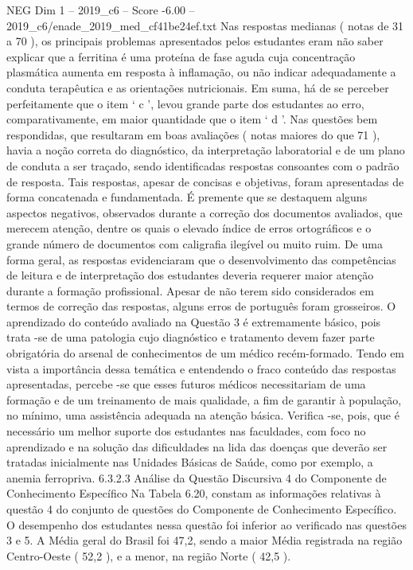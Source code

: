 \begin{textsample}{NEG Dim 1 – 2019\_c6 – Score -6.00 – 2019\_c6/enade\_2019\_med\_cf41be24ef.txt}
Nas respostas medianas ( notas de 31 a 70 ), os principais problemas apresentados pelos estudantes eram não saber explicar que a ferritina é uma proteína de fase aguda cuja concentração plasmática aumenta em resposta à inflamação, ou não indicar adequadamente a conduta terapêutica e as orientações nutricionais.
Em suma, há de se perceber perfeitamente que o item ‘ c ’, levou grande parte dos estudantes ao erro, comparativamente, em maior quantidade que o item ‘ d ’.
Nas questões bem respondidas, que resultaram em boas avaliações ( notas maiores do que 71 ), havia a noção correta do diagnóstico, da interpretação laboratorial e de um plano de conduta a ser traçado, sendo identificadas respostas consoantes com o padrão de resposta.
Tais respostas, apesar de concisas e objetivas, foram apresentadas de forma concatenada e fundamentada.
É premente que se destaquem alguns aspectos negativos, observados durante a correção dos documentos avaliados, que merecem atenção, dentre os quais o elevado índice de erros ortográficos e o grande número de documentos com caligrafia ilegível ou muito ruim.
De uma forma geral, as respostas evidenciaram que o desenvolvimento das competências de leitura e de interpretação dos estudantes deveria requerer maior atenção durante a formação profissional.
Apesar de não terem sido considerados em termos de correção das respostas, alguns erros de português foram grosseiros.
O aprendizado do conteúdo avaliado na Questão 3 é extremamente básico, pois trata -se de uma patologia cujo diagnóstico e tratamento devem fazer parte obrigatória do arsenal de conhecimentos de um médico recém-formado.
Tendo em vista a importância dessa temática e entendendo o fraco conteúdo das respostas apresentadas, percebe -se que esses futuros médicos necessitariam de uma formação e de um treinamento de mais qualidade, a fim de garantir à população, no mínimo, uma assistência adequada na atenção básica.
Verifica -se, pois, que é necessário um melhor suporte dos estudantes nas faculdades, com foco no aprendizado e na solução das dificuldades na lida das doenças que deverão ser tratadas inicialmente nas Unidades Básicas de Saúde, como por exemplo, a anemia ferropriva. 6.3.2.3 Análise da Questão Discursiva 4 do Componente de Conhecimento Específico Na Tabela 6.20, constam as informações relativas à questão 4 do conjunto de questões do Componente de Conhecimento Específico.
O desempenho dos estudantes nessa questão foi inferior ao verificado nas questões 3 e 5.
A Média geral do Brasil foi 47,2, sendo a maior Média registrada na região Centro-Oeste ( 52,2 ), e a menor, na região Norte ( 42,5 ).

\end{textsample}
